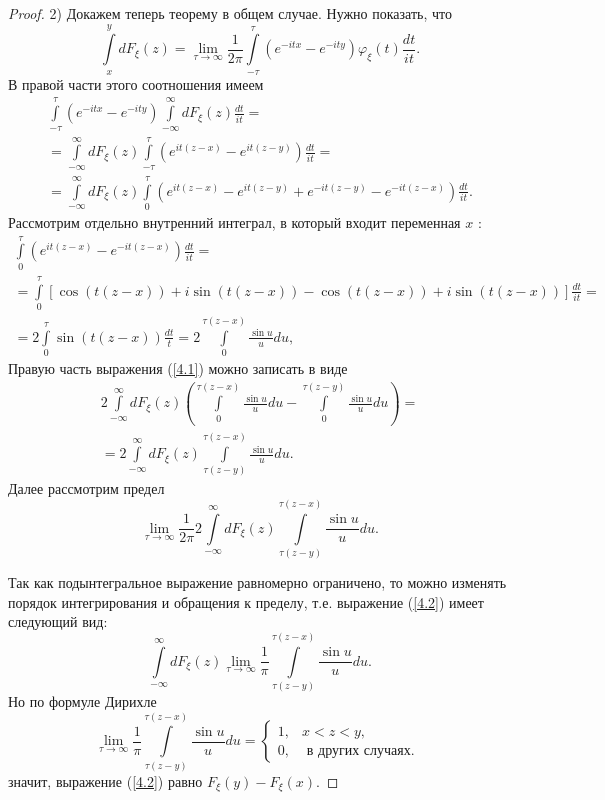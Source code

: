 \begin{proof}
    2) Докажем теперь теорему в общем случае. Нужно показать, что
    $$
    \int\limits_x^y d F_{\xi}(z)=\lim _{\tau \rightarrow \infty} \frac{1}{2 \pi} \int\limits_{-\tau}^\tau\left(e^{-i t x}-e^{-i t y}\right) \varphi_{\xi}(t) \frac{d t}{i t} .
    $$
    В правой части этого соотношения имеем
    \begin{equation}
        \begin{gathered}
        \int\limits_{-\tau}^\tau\left(e^{-i t x}-e^{-i t y}\right) \int\limits_{-\infty}^{\infty} d F_{\xi}(z) \frac{d t}{i t}= \\
        =\int\limits_{-\infty}^{\infty} d F_{\xi}(z) \int\limits_{-\tau}^\tau\left(e^{i t(z-x)}-e^{i t(z-y)}\right) \frac{d t}{i t}= \\
        =\int\limits_{-\infty}^{\infty} d F_{\xi}(z) \int\limits_0^\tau\left(e^{i t(z-x)}-e^{i t(z-y)}+e^{-i t(z-y)}-e^{-i t(z-x)}\right) \frac{d t}{i t} .
        \end{gathered}
        \label{4.1}
    \end{equation}
    Рассмотрим отдельно внутренний интеграл, в который входит переменная $x$ :
    $$
    \begin{gathered}
    \int\limits_0^\tau\left(e^{i t(z-x)}-e^{-i t(z-x)}\right) \frac{d t}{i t}= \\
    =\int\limits_0^\tau[\cos (t(z-x))+i \sin (t(z-x))-\cos (t(z-x))+i \sin (t(z-x))] \frac{d t}{i t}= \\
    =2 \int\limits_0^\tau \sin (t(z-x)) \frac{d t}{t}=2 \int\limits_0^{\tau(z-x)} \frac{\sin u}{u} d u,
    \end{gathered}
    $$
    Правую часть выражения (\ref{4.1}) можно записать в виде
        $$
    \begin{gathered}
    2 \int\limits_{-\infty}^{\infty} d F_{\xi}(z)\left(\int\limits_0^{\tau(z-x)} \frac{\sin u}{u} d u-\int\limits_0^{\tau(z-y)} \frac{\sin u}{u} d u\right)= \\
    =2 \int\limits_{-\infty}^{\infty} d F_{\xi}(z) \int\limits_{\tau(z-y)}^{\tau(z-x)} \frac{\sin u}{u} d u .
    \end{gathered}
    $$
    Далее рассмотрим предел
    \begin{equation}
         \lim _{\tau \rightarrow \infty} \frac{1}{2 \pi} 2 \int\limits_{-\infty}^{\infty} d F_{\xi}(z) \int\limits_{\tau(z-y)}^{\tau(z-x)} \frac{\sin u}{u} d u .
         \label{4.2}
    \end{equation}
    
    Так как подынтегральное выражение равномерно ограничено, то можно изменять порядок интегрирования и обращения к пределу, т.е. выражение (\ref{4.2}) имеет следующий вид:
    $$
    \int\limits_{-\infty}^{\infty} d F_{\xi}(z) \lim _{\tau \rightarrow \infty} \frac{1}{\pi} \int\limits_{\tau(z-y)}^{\tau(z-x)} \frac{\sin u}{u} d u .
    $$
    Но по формуле Дирихле
    $$
    \lim _{\tau \rightarrow \infty} \frac{1}{\pi} \int\limits_{\tau(z-y)}^{\tau(z-x)} \frac{\sin u}{u} d u= \begin{cases}1, & x<z<y, \\ 0, & \text { в других случаях. }\end{cases}
    $$
    значит, выражение (\ref{4.2}) равно $F_{\xi}(y)-F_{\xi}(x)$. 
    \end{proof}

